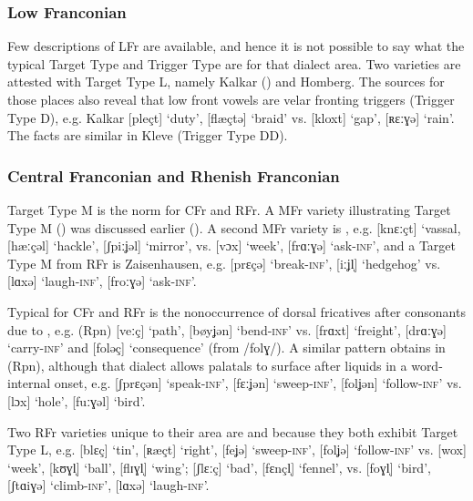 \subsubsection{Low Franconian} Few descriptions of LFr are available, and hence it is not possible to say what the typical Target Type and Trigger Type are for that dialect area. Two varieties are attested with Target Type L, namely Kalkar () and Homberg. The sources for those places also reveal that low front vowels are velar fronting triggers (Trigger Type D), e.g. Kalkar [pleçt] ‘duty’, [flæçtə] ‘braid’ vs. [kloxt] ‘gap’, [ʀɛːɣə] ‘rain’. The facts are similar in Kleve (Trigger Type DD).

\subsubsection{Central Franconian and Rhenish Franconian}
Target Type M is the norm for CFr and RFr. A MFr variety illustrating Target Type M () was discussed earlier (). A second MFr variety is , e.g. [knɛːçt] ‘vassal, [hæːçəl] ‘hackle’, [ʃpiːʝəl] ‘mirror’, vs. [vɔx] ‘week’, [frɑːɣə] ‘ask\textsc{{}-inf}’, and a Target Type M from RFr is Zaisenhausen, e.g. [prɛçə] ‘break\textsc{{}-inf}’, [iːʝl̩] ‘hedgehog’ vs. [lɑxə] ‘laugh\textsc{{}-inf}’, [froːɣə] ‘ask\textsc{{}-inf}’.\largerpage

\begin{sloppypar}
Typical for CFr and RFr is the nonoccurrence of dorsal fricatives after consonants due to , e.g. (Rpn)  [veːç] ‘path’, [bøyʝən] ‘bend\textsc{{}-inf}’ vs. [frɑxt] ‘freight’, [drɑːɣə] ‘carry\textsc{{}-inf}’ and [foləç] ‘consequence’ (from /folɣ/). A similar pattern obtains in  (Rpn), although that dialect allows palatals to surface after liquids in a word-internal onset, e.g. [ʃprɛçən] ‘speak\textsc{{}-inf}’, [fɛːʝən] ‘sweep\textsc{{}-inf}’, [folʝən] ‘follow\textsc{{}-inf}’ vs. [lɔx] ‘hole’, [fuːɣəl] ‘bird’.
\end{sloppypar}

Two RFr varieties unique to their area are  and  because they both exhibit Target Type L, e.g.  [blɛç] ‘tin’, [ʀæçt] ‘right’, [feʝə] ‘sweep\textsc{{}-inf}’, [folʝə] ‘follow\textsc{{}-inf}’ vs. [wox] ‘week’, [kʊɣl̩] ‘ball’, [flɪɣl̩] ‘wing’;  [ʃlɛːç] ‘bad’, [fɛnçl̩] ‘fennel’, vs. [foɣl̩] ‘bird’, [ʃtɑiɣə] ‘climb\textsc{{}-inf}’, [lɑxə] ‘laugh\textsc{{}-inf}’.

